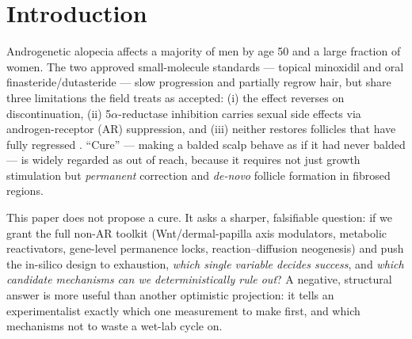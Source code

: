 \documentclass[11pt,a4paper]{article}
\begin{document}
\section{Introduction}
\label{sec:intro}

Androgenetic alopecia affects a majority of men by age 50 and a large fraction of
women. The two approved small-molecule standards --- topical minoxidil and oral
finasteride/dutasteride --- slow progression and partially regrow hair, but share
three limitations the field treats as accepted: (i) the effect reverses on
discontinuation, (ii) 5$\alpha$-reductase inhibition carries sexual side effects
via androgen-receptor (AR) suppression, and (iii) neither restores follicles that
have fully regressed \citep{kaufman1998}. ``Cure'' --- making a balded scalp behave as if it had never
balded --- is widely regarded as out of reach, because it requires not just
growth stimulation but \emph{permanent} correction and \emph{de-novo} follicle
formation in fibrosed regions.

This paper does not propose a cure. It asks a sharper, falsifiable question: if we
grant the full non-AR toolkit (Wnt/dermal-papilla axis modulators, metabolic
reactivators, gene-level permanence locks, reaction--diffusion neogenesis) and
push the in-silico design to exhaustion, \emph{which single variable decides
success}, and \emph{which candidate mechanisms can we deterministically rule out}?
A negative, structural answer is more useful than another optimistic projection:
it tells an experimentalist exactly which one measurement to make first, and which
mechanisms not to waste a wet-lab cycle on.
\end{document}
